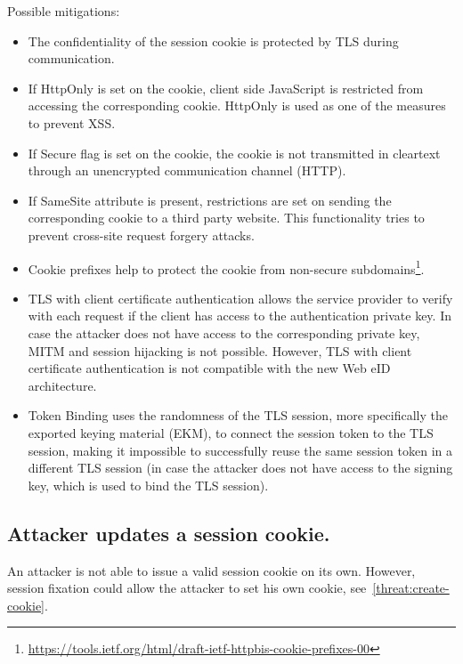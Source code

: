 Possible mitigations:
\begin{itemize}
\item The confidentiality of the session cookie is protected by TLS during communication.

\item If HttpOnly is set on the cookie, client side JavaScript is restricted from accessing the corresponding cookie. HttpOnly is used as one of the measures to prevent XSS.

\item If Secure flag is set on the cookie, the cookie is not transmitted in cleartext through an unencrypted communication channel (HTTP).

\item If SameSite attribute is present, restrictions are set on sending the corresponding cookie to a third party website. This functionality tries to prevent cross-site request forgery attacks. 

\item Cookie prefixes help to protect the cookie from non-secure subdomains\footnote{\url{https://tools.ietf.org/html/draft-ietf-httpbis-cookie-prefixes-00}}.

\item TLS with client certificate authentication allows the service provider to verify with each request if the client has access to the authentication private key. In case the attacker does not have access to the corresponding private key, MITM and session hijacking is not possible. However, TLS with client certificate authentication is not compatible with the new Web eID architecture.

\item Token Binding uses the randomness of the TLS session, more specifically the exported keying material (EKM), to connect the session token to the TLS session, making it impossible to successfully reuse the same session token in a different TLS session (in case the attacker does not have access to the signing key, which is used to bind the TLS session).
\end{itemize}


\subsection{Attacker updates a session cookie.}
\label{threat:update-cookie}
An attacker is not able to issue a valid session cookie on its own. However, session fixation could allow the attacker to set his own cookie, see~\ref{threat:create-cookie}.


